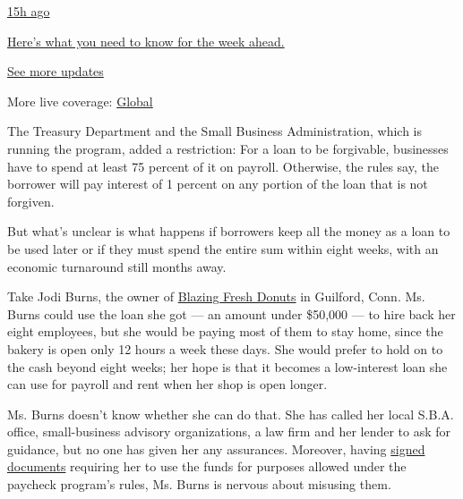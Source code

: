 \href{https://www.nytimes3xbfgragh.onion/live/2020/08/17/business/stock-market-today-coronavirus?action=click\&pgtype=Article\&state=default\&region=MAIN_CONTENT_1\&context=storylines_live_updates\#heres-what-you-need-to-know-for-the-week-ahead}{15h
ago}

\href{https://www.nytimes3xbfgragh.onion/live/2020/08/17/business/stock-market-today-coronavirus?action=click\&pgtype=Article\&state=default\&region=MAIN_CONTENT_1\&context=storylines_live_updates\#heres-what-you-need-to-know-for-the-week-ahead}{Here's
what you need to know for the week ahead.}

\href{https://www.nytimes3xbfgragh.onion/live/2020/08/17/business/stock-market-today-coronavirus?action=click\&pgtype=Article\&state=default\&region=MAIN_CONTENT_1\&context=storylines_live_updates}{See
more updates}

More live coverage:
\href{https://www.nytimes3xbfgragh.onion/2020/08/17/world/coronavirus-covid.html?action=click\&pgtype=Article\&state=default\&region=MAIN_CONTENT_1\&context=storylines_live_updates}{Global}

The Treasury Department and the Small Business Administration, which is
running the program, added a restriction: For a loan to be forgivable,
businesses have to spend at least 75 percent of it on payroll.
Otherwise, the rules say, the borrower will pay interest of 1 percent on
any portion of the loan that is not forgiven.

But what's unclear is what happens if borrowers keep all the money as a
loan to be used later or if they must spend the entire sum within eight
weeks, with an economic turnaround still months away.

Take Jodi Burns, the owner of
\href{https://www.blazingfreshdonuts.com/}{Blazing Fresh Donuts} in
Guilford, Conn. Ms. Burns could use the loan she got --- an amount under
\$50,000 --- to hire back her eight employees, but she would be paying
most of them to stay home, since the bakery is open only 12 hours a week
these days. She would prefer to hold on to the cash beyond eight weeks;
her hope is that it becomes a low-interest loan she can use for payroll
and rent when her shop is open longer.

Ms. Burns doesn't know whether she can do that. She has called her local
S.B.A. office, small-business advisory organizations, a law firm and her
lender to ask for guidance, but no one has given her any assurances.
Moreover, having
\href{https://home.treasury.gov/system/files/136/PPP-Borrower-Application-Form-Fillable.pdf}{signed
documents} requiring her to use the funds for purposes allowed under the
paycheck program's rules, Ms. Burns is nervous about misusing them.

